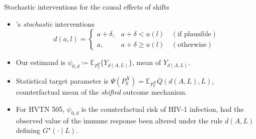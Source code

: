 \documentclass{beamer}
\newcommand{\E}{\mathbb{E}}
\begin{document}

\begin{frame}[c]{Stochastic interventions for the causal effects of shifts}

\begin{center}
\begin{itemize}
  \itemsep10pt
  \item \cite{diaz2012population, diaz2018stochastic}'s \textit{stochastic}
    interventions
     \begin{equation*}\label{shift_intervention}
       d(a, l) =
         \begin{cases}
           a + \delta, & a + \delta < u(l) \quad (\text{if plausible}) \\
           a, & a + \delta \geq u(l) \quad (\text{otherwise})
         \end{cases}
     \end{equation*}
  \item Our estimand is $\psi_{0, d} \coloneqq \E_{P_0^d}\{Y_{d(A,L)}\}$, mean
    of $Y_{d(A, L)}$.
  \item Statistical target parameter is
    $\Psi(P_0^X) = \E_{P_0^X}{\overline{Q}(d(A, L), L)}$, counterfactual mean
    of the \textit{shifted} outcome mechanism.
  \item For HVTN 505, $\psi_{0,d}$ is the counterfactual risk of HIV-1
    infection, had the observed value of the immune response been altered under
    the rule $d(A,L)$ defining $G^{\star}(\cdot \mid L)$.
\end{itemize}
\end{center}


\end{frame}

\end{document}

